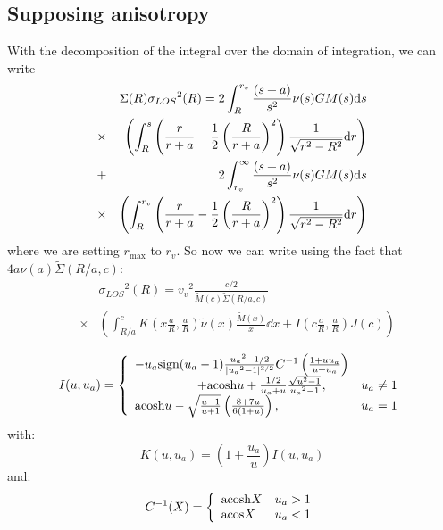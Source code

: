 \subsection{Supposing \citet{Mamon+05} anisotropy}
%
With the decomposition of the integral over the domain of integration, we can
write
%
\begin{eqnarray}
    &&\Sigma{(R)}{\sigma_{LOS}}^2{(R)}=2\int_R^{r_v}{\frac{\left({s+a}\right)}{s^2}{\nu(s)}{G}{M(s)}}{{\rm{d}}{s}}\nonumber\\
    &\times&\left(\int_R^s{\left(\frac{r}{r+a}-\frac{1}{2}\left(\frac{R}{r+a}\right)^2\right)\frac{1}{\sqrt{r^2-R^2}}{\rm{d}}{r}}\right)\nonumber\\
    &+&2\int_{r_v}^{\infty}{\frac{\left({s+a}\right)}{s^2}{\nu(s)}{G}{M(s)}}{{\rm{d}}{s}}\nonumber\\
    &\times&\left(\int_R^{r_v}{\left(\frac{r}{r+a}-\frac{1}{2}\left(\frac{R}{r+a}\right)^2\right)\frac{1}{\sqrt{r^2-R^2}}{\rm{d}}{r}}\right)\nonumber\\
\end{eqnarray}
%
where we are setting $r_{\max}$ to $r_v$. So now we can write using the
fact that $4a\nu(a)\widetilde{\Sigma}(R/a,c)$:
%
\begin{eqnarray}
    &&{\sigma_{LOS}}^2{(R)}={v_v}^2\frac{c/2}{\widetilde{M}{(c)}\widetilde{\Sigma}{(R/a,c)}}\nonumber\\
    &\times&\left(\int_{R/a}^c{{K}\left({x\frac{a}{R},\frac{a}{R}}\right)}\widetilde{\nu}{(x)}
    \frac{\widetilde{M}{(x)}}{x}\dd{x}+I\left({c\frac{a}{R},\frac{a}{R}}\right){J(c)}\right)\nonumber\\
\end{eqnarray}
%
\begin{equation}
    I(u,u_a)=\left\{\begin{array}{lr}
        -u_a{\rm{sign}}(u_a-1)\frac{{u_a}^2-1/2}{|{u_a}^2-1|^{3/2}}{C^{-1}\left(\frac{1+u{u_a}}{u+u_a}\right)}&\\
        \hspace{5em}+{\rm{acosh}}{u}+\frac{1/2}{u_a+u}\frac{\sqrt{u^2-1}}{{u_a}^2-1},&{u_a}\neq1\\
        {\rm{acosh}}{u}-\sqrt{\frac{u-1}{u+1}}\left(\frac{8+7u}{6(1+u)}\right),&{u_a}=1\\
    \end{array}\right.
\end{equation}
%
with:
%
\begin{equation}
    K(u,u_a)=\left({1+\frac{u_a}{u}}\right){I(u,u_a)}
\end{equation}
%
and:
%
\begin{equation}
    C^{-1}(X)=\left\{\begin{array}{lr}
        {\rm{acosh}}{X}&u_a>1\\
        {\rm{acos}}{X}&u_a<1\\
    \end{array}\right.
\end{equation}
